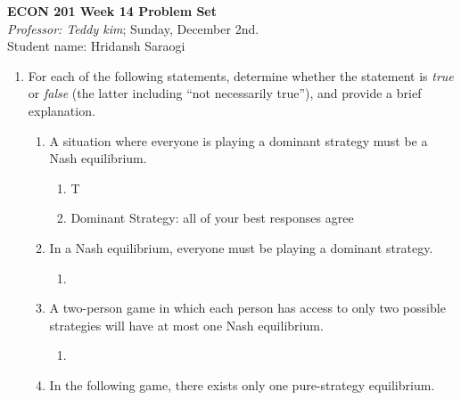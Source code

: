 \documentclass[11pt]{article}
\begin{document}
\begin{center}
\textbf{ECON 201 Week 14 Problem Set}\\
\textit {Professor: Teddy kim};  
Sunday, December 2nd.
\\Student name: Hridansh Saraogi
\end{center}

\begin{enumerate}
\item For each of the following statements, determine whether
the statement is \emph{true} or \emph{false} (the latter including ``not necessarily true''), and provide a brief explanation.
    \begin{enumerate}
    \item A situation where everyone is playing a dominant strategy must be a Nash equilibrium.
    \begin{enumerate}
        \item T
        \item Dominant Strategy: all of your best responses agree
    \end{enumerate}

    \item In a Nash equilibrium, everyone must be playing a dominant strategy.
    \begin{enumerate}
        \item 
    \end{enumerate}

    \item A two-person game in which each person has access to only two possible strategies will have at most one Nash equilibrium.
    \begin{enumerate}
        \item 
    \end{enumerate}

    \item In the following game, there exists only one pure-strategy equilibrium.
        \begin{figure}[h!]
    \begin{center}
\end{center}
\end{figure}
\end{enumerate}
\end{enumerate}
\end{document}
